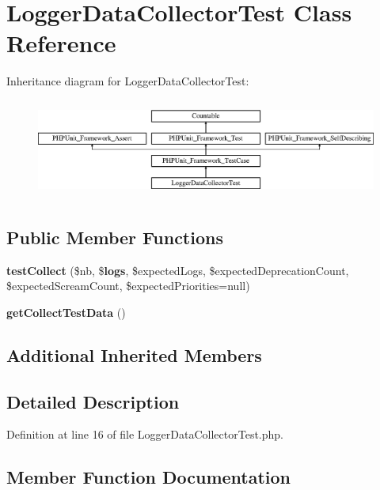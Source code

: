 \section{Logger\+Data\+Collector\+Test Class Reference}
\label{class_symfony_1_1_component_1_1_http_kernel_1_1_tests_1_1_data_collector_1_1_logger_data_collector_test}
Inheritance diagram for Logger\+Data\+Collector\+Test\+:\begin{figure}[H]
\begin{center}
\leavevmode
\includegraphics[height=3.303835cm]{class_symfony_1_1_component_1_1_http_kernel_1_1_tests_1_1_data_collector_1_1_logger_data_collector_test}
\end{center}
\end{figure}
\subsection*{Public Member Functions}
\begin{DoxyCompactItemize}
\item 
{\bf test\+Collect} (\$nb, \${\bf logs}, \$expected\+Logs, \$expected\+Deprecation\+Count, \$expected\+Scream\+Count, \$expected\+Priorities=null)
\item 
{\bf get\+Collect\+Test\+Data} ()
\end{DoxyCompactItemize}
\subsection*{Additional Inherited Members}


\subsection{Detailed Description}


Definition at line 16 of file Logger\+Data\+Collector\+Test.\+php.



\subsection{Member Function Documentation}
